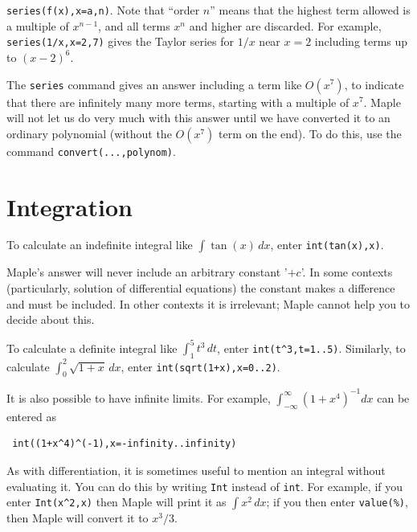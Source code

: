 \documentclass{amsart}
\begin{document}
\begin{secenum}
  \verb~series(f(x),x=a,n)~.  Note that ``order $n$'' means
  that the highest term allowed is a multiple of $x^{n-1}$,
  and all terms $x^n$ and higher are discarded.  For
  example, \verb~series(1/x,x=2,7)~ gives the Taylor series
  for $1/x$ near $x=2$ including terms up to $(x-2)^6$. 
%
 \item\label{taylorconv}
  The \verb~series~ command gives an answer including a term
  like $O(x^7)$,  to indicate that there are
   infinitely many more terms, starting with a multiple of
   $x^{7}$.  Maple will not let us do very much with this
   answer until we have converted it to an ordinary
   polynomial (without the $O(x^7)$ term on the end).  To do
   this, use the command \verb~convert(...,polynom)~. 
\end{secenum}

\section{Integration}\label{sec-int}



\begin{secenum}
%
 \item\label{int} To calculate an indefinite integral like
  $\int\tan(x)\,dx$, enter \verb~int(tan(x),x)~. 
%
 \item\label{intconst} Maple's answer will never include an arbitrary
  constant '$+c$'.  In some contexts (particularly, solution
  of differential equations) the constant makes a
  difference and must be included.  In other contexts it
  is irrelevant; Maple cannot help you to decide about
  this. 
%
 \item\label{defint} To calculate a definite integral like
  $\int_1^5t^3\,dt$, enter \verb~int(t^3,t=1..5)~. 
  Similarly, to calculate $\int_0^2\sqrt{1+x}\,dx$, enter
  \verb~int(sqrt(1+x),x=0..2)~. 
%
 \item\label{improper} It is also possible to have infinite limits.  For
  example, $\int_{-\infty}^\infty (1+x^4)^{-1}dx$ can be 
  entered as 
\begin{verbatim}
 int((1+x^4)^(-1),x=-infinity..infinity)
\end{verbatim}
%
 \item\label{inertint} As with differentiation, it is sometimes useful to
  mention an integral without evaluating it.  You can do
  this by writing \verb~Int~ instead of \verb~int~.  For
  example, if you enter \verb~Int(x^2,x)~ then Maple will
  print it as $\int x^2\,dx$; if you then enter
  \verb~value(%)~, then Maple will convert it to $x^3/3$. 
\end{secenum}
\end{document}
